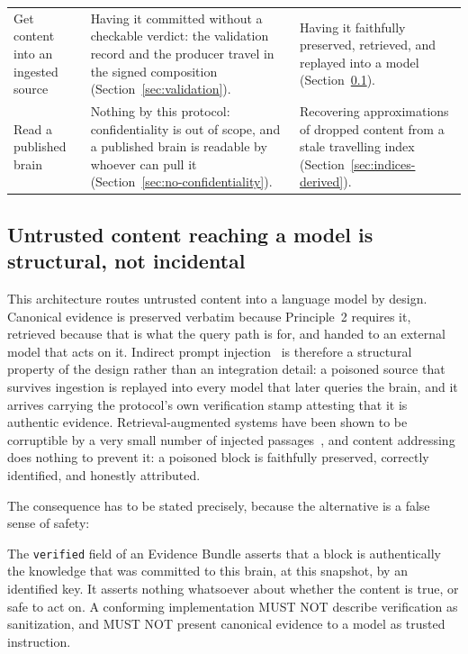 \documentclass[11pt,a4paper]{article}
\begin{document}
\begin{table}[htbp]
\begin{tabularx}{\textwidth}{YYY}
Get content into an ingested source & Having it committed without a checkable
verdict: the validation record and the producer travel in the signed
composition (Section~\ref{sec:validation}). &
  Having it faithfully preserved, retrieved, and replayed into a model
  (Section~\ref{sec:injection}). \\
Read a published brain & Nothing by this protocol: confidentiality is out of
scope, and a published brain is readable by whoever can pull it
(Section~\ref{sec:no-confidentiality}). & Recovering approximations of dropped
content from a stale travelling index (Section~\ref{sec:indices-derived}). \\
\bottomrule
\end{tabularx}
\end{table}

\subsection{Untrusted content reaching a model is structural, not incidental}
\label{sec:injection}

This architecture routes untrusted content into a language model by design.
Canonical evidence is preserved verbatim because Principle~2 requires it,
retrieved because that is what the query path is for, and handed to an external
model that acts on it. Indirect prompt injection~\cite{greshake2023injection} is
therefore a structural property of the design rather than an integration detail:
a poisoned source that survives ingestion is replayed into every model that later
queries the brain, and it arrives carrying the protocol's own verification stamp
attesting that it is authentic evidence. Retrieval-augmented systems have been
shown to be corruptible by a very small number of injected
passages~\cite{zou2024poisonedrag}, and content addressing does nothing to
prevent it: a poisoned block is faithfully preserved, correctly identified, and
honestly attributed.

The consequence has to be stated precisely, because the alternative is a false
sense of safety:

\begin{callout}[title={What \texttt{verified} means, and what it does not}]
The \texttt{verified} field of an Evidence Bundle asserts that a block is
authentically the knowledge that was committed to this brain, at this snapshot,
by an identified key. It asserts nothing whatsoever about whether the content is
true, or safe to act on. A conforming implementation MUST NOT describe
verification as sanitization, and MUST NOT present canonical evidence to a model
as trusted instruction.
\end{callout}
\end{document}

